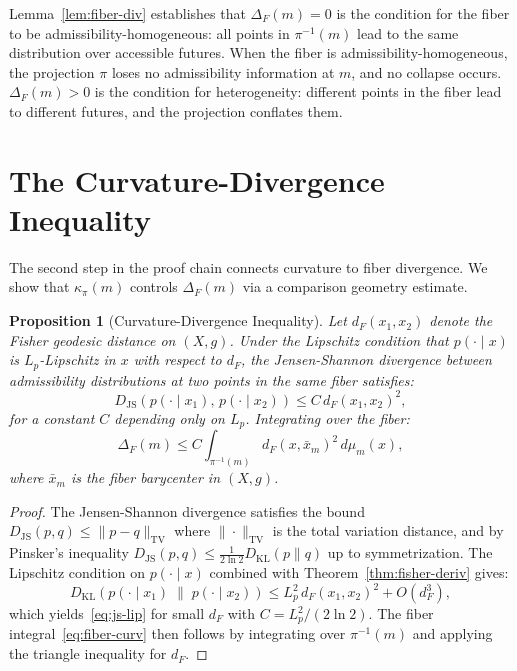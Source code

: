 \documentclass[12pt, oneside]{book}
\theoremstyle{plain-flyxion}
\newtheorem{proposition}[theorem]{Proposition}
\theoremstyle{definition-flyxion}
\newcommand{\kpi}{\kappa_{\pi}}
\begin{document}
Lemma~\ref{lem:fiber-div} establishes that $\Delta_F(m) = 0$ is the condition for the
fiber to be admissibility-homogeneous: all points in $\pi^{-1}(m)$ lead to the same
distribution over accessible futures. When the fiber is admissibility-homogeneous,
the projection $\pi$ loses no admissibility information at $m$, and no collapse occurs.
$\Delta_F(m) > 0$ is the condition for heterogeneity: different points in the fiber
lead to different futures, and the projection conflates them.

\section{The Curvature-Divergence Inequality}

The second step in the proof chain connects curvature to fiber divergence. We show that
$\kpi(m)$ controls $\Delta_F(m)$ via a comparison geometry estimate.

\begin{proposition}[Curvature-Divergence Inequality]\label{prop:curv-div}
Let $d_F(x_1, x_2)$ denote the Fisher geodesic distance on $(X, g)$. Under the
Lipschitz condition that $p(\cdot \mid x)$ is $L_p$-Lipschitz in $x$ with respect to
$d_F$, the Jensen-Shannon divergence between admissibility distributions at two points in
the same fiber satisfies:
\begin{equation}\label{eq:js-lip}
D_{\mathrm{JS}}\!\left(p(\cdot \mid x_1),\, p(\cdot \mid x_2)\right)
\leq C\, d_F(x_1, x_2)^2,
\end{equation}
for a constant $C$ depending only on $L_p$. Integrating over the fiber:
\begin{equation}\label{eq:fiber-curv}
\Delta_F(m) \leq C \int_{\pi^{-1}(m)} d_F(x, \bar{x}_m)^2\, d\mu_m(x),
\end{equation}
where $\bar{x}_m$ is the fiber barycenter in $(X, g)$.
\end{proposition}

\begin{proof}
The Jensen-Shannon divergence satisfies the bound $D_{\mathrm{JS}}(p,q) \leq
\|p - q\|_{\mathrm{TV}}$ where $\|\cdot\|_{\mathrm{TV}}$ is the total variation distance,
and by Pinsker's inequality $D_{\mathrm{JS}}(p,q) \leq \frac{1}{2\ln 2}
D_{\mathrm{KL}}(p \| q)$ up to symmetrization. The Lipschitz condition on $p(\cdot\mid
x)$ combined with Theorem~\ref{thm:fisher-deriv} gives:
\[
D_{\mathrm{KL}}\!\left(p(\cdot \mid x_1) \;\|\; p(\cdot \mid x_2)\right)
\leq L_p^2\, d_F(x_1, x_2)^2 + O(d_F^3),
\]
which yields~\eqref{eq:js-lip} for small $d_F$ with $C = L_p^2/(2\ln 2)$. The fiber
integral~\eqref{eq:fiber-curv} then follows by integrating over $\pi^{-1}(m)$ and
applying the triangle inequality for $d_F$.
\end{proof}
\end{document}
